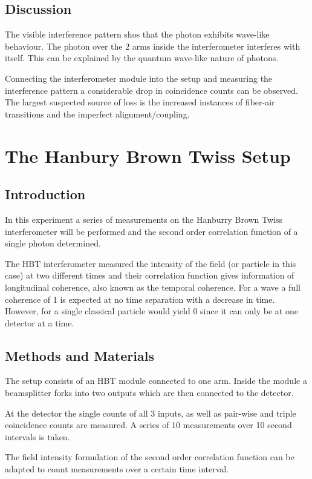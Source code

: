 \documentclass[12pt,a4paper]{article} %
\begin{document}
\subsection{Discussion}
The visible interference pattern shos that the photon exhibits wave-like behaviour. The photon over the 2 arms inside the interferometer interferes with itself. This can be explained by the quantum wave-like nature of photons.

Connecting the interferometer module into the setup and measuring the interference pattern a considerable drop in coincidence counts can be observed. The largest suspected source of loss is the increased instances of fiber-air transitions and the imperfect alignment/coupling.

\section{The Hanbury Brown Twiss Setup}
\subsection{Introduction}
In this experiment a series of measurements on the Hanburry Brown Twiss interferometer will be performed and the second order correlation function of a single photon determined.

The HBT interferometer measured the intensity of the field (or particle in this case) at two different times and their correlation function gives information of longitudinal coherence, also known as the temporal coherence. For a wave a full coherence of 1 is expected at no time separation with a decrease in time. However, for a single classical particle would yield 0 since it can only be at one detector at a time.


\subsection{Methods and Materials}
The setup consists of an HBT module connected to one arm. Inside the module a beamsplitter forks into two outputs which are then connected to the detector. 

At the detector the single counts of all 3 inputs, as well as pair-wise and triple coincidence counts are measured. A series of 10 measurements over 10 second intervals is taken.   

The field intensity formulation of the second order correlation function can be adapted to count measurements over a certain time interval.
\end{document}
